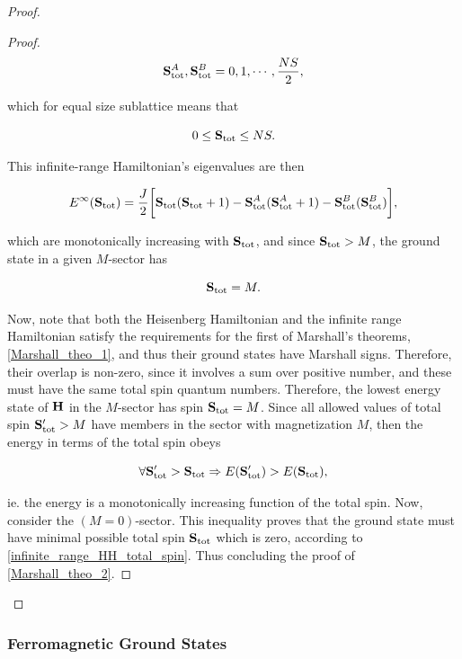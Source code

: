 \documentclass{homework}
\begin{document}
\begin{proof}
\begin{proof}
$$
    {\bf S}_{\textnormal{tot}}^A, {\bf S}_{\textnormal{tot}}^B = 0, 1, \cdots, \frac{NS}{2},
$$

which for equal size sublattice means that 

\begin{equation}
    0 \leq {\bf S}_{\textnormal{tot}} \leq NS.
    \label{infinite_range_HH_total_spin}
\end{equation}

This infinite-range Hamiltonian's eigenvalues are then 

\begin{equation}
    E^{\infty} ({\bf S}_{\textnormal{tot}}) = \frac{J}{2} \bigg[{\bf S}_{\textnormal{tot}}({\bf S}_{\textnormal{tot}} + 1) - {\bf S}_{\textnormal{tot}}^A({\bf S}_{\textnormal{tot}}^A+1) - {\bf S}_{\textnormal{tot}}^B({\bf S}_{\textnormal{tot}}^B)\bigg],
\end{equation}

which are monotonically increasing with ${\bf S}_{\textnormal{tot}}$, and since ${\bf S}_{\textnormal{tot}} > M$, the ground state in a given $M$-sector has 

$$
{\bf S}_{\textnormal{tot}} = M.
$$

Now, note that both the Heisenberg Hamiltonian and the infinite range Hamiltonian satisfy the requirements for the first of Marshall's theorems, \cref{Marshall_theo_1}, and thus their ground states have Marshall signs. Therefore, their overlap is non-zero, since it involves a sum over positive number, and these must have the same total spin quantum numbers. Therefore, the lowest energy state of ${\bf H}$ in the $M$-sector has spin ${\bf S}_{\textnormal{tot}} = M$. Since all allowed values of total spin ${\bf S}_{\textnormal{tot}}' > M$ have members in the sector with magnetization $M$, then the energy in terms of the total spin obeys 

$$
    \forall {\bf S}_{\textnormal{tot}}' > {\bf S}_{\textnormal{tot}} \Rightarrow E({\bf S}_{\textnormal{tot}}') > E({\bf S}_{\textnormal{tot}}),
$$

ie. the energy is a monotonically increasing function of the total spin. Now, consider the $(M=0)$-sector. This inequality proves that the ground state must have minimal possible total spin ${\bf S}_{\textnormal{tot}}$ which is zero, according to \cref{infinite_range_HH_total_spin}. Thus concluding the proof of \cref{Marshall_theo_2}.
\end{proof}
\end{proof}

\subsubsection{Ferromagnetic Ground States}
\end{document}
